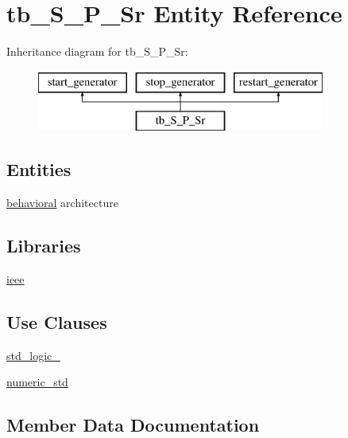 \hypertarget{classtb___s___p___sr}{}\section{tb\+\_\+\+S\+\_\+\+P\+\_\+\+Sr Entity Reference}
\label{classtb___s___p___sr}
Inheritance diagram for tb\+\_\+\+S\+\_\+\+P\+\_\+\+Sr\+:\begin{figure}[H]
\begin{center}
\leavevmode
\includegraphics[height=2.000000cm]{classtb___s___p___sr}
\end{center}
\end{figure}
\subsection*{Entities}
\begin{DoxyCompactItemize}
\item 
\hyperlink{classtb___s___p___sr_1_1behavioral}{behavioral} architecture
\end{DoxyCompactItemize}
\subsection*{Libraries}
 \begin{DoxyCompactItemize}
\item 
\hyperlink{classtb___s___p___sr_a0a6af6eef40212dbaf130d57ce711256}{ieee} 
\end{DoxyCompactItemize}
\subsection*{Use Clauses}
 \begin{DoxyCompactItemize}
\item 
\hyperlink{classtb___s___p___sr_acd03516902501cd1c7296a98e22c6fcb}{std\+\_\+logic\+\_}   
\item 
\hyperlink{classtb___s___p___sr_a2edc34402b573437d5f25fa90ba4013e}{numeric\+\_\+std}   
\end{DoxyCompactItemize}


\subsection{Member Data Documentation}
